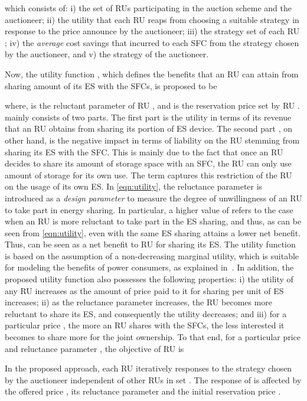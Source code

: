 \documentclass[journal,10pt]{IEEEtran}
\begin{document}
which consists of: i) the set of RUs  participating in the auction scheme and the auctioneer; ii) the utility  that each RU  reaps from choosing a suitable strategy  in response to the price  announce by the auctioneer; iii) the strategy set  of each RU ; iv) the \emph{average} cost savings  that incurred to each SFC  from the strategy chosen by the auctioneer, and v) the strategy  of the auctioneer.

Now, the utility function , which defines the benefits that an RU  can attain from sharing  amount of its ES with the SFCs, is proposed to be

where,  is the reluctant parameter of RU , and  is the reservation price set by RU .  mainly consists of two parts. The first part  is the utility in terms of its revenue that an RU  obtains from sharing its  portion of ES device. The second part , on other hand, is the negative impact in terms of liability on the RU  stemming from sharing its ES with the SFC. This is mainly due to the fact that once an RU decides to share its  amount of storage space with an SFC, the RU can only use  amount of storage for its own use. The term  captures this restriction of the RU on the usage of its own ES. In \eqref{eqn:utility}, the reluctance parameter  is introduced as a \emph{design parameter} to measure the degree of unwillingness of an RU to take part in energy sharing. In particular, a higher value of  refers to the case when an RU  is more reluctant to take part in the ES sharing, and thus, as can be seen from \eqref{eqn:utility}, even with the same ES sharing attains a lower net benefit. Thus,  can be seen as a net benefit to RU  for sharing its ES. The utility function is based on the assumption of a non-decreasing marginal utility, which is suitable for modeling the benefits of power consumers, as explained in~\cite{Samadi-C-Smartgridcomm:2010}. In addition, the proposed utility function also possesses the following properties: i)  the utility of any RU increases as the amount of price  paid to it for sharing per unit of ES increases; ii) as the reluctance parameter  increases, the  RU  becomes more reluctant to share its ES, and consequently the utility decreases; and iii) for a particular price , the more an RU shares with the SFCs, the less interested it becomes to share more for the joint ownership. To that end, for a particular price  and reluctance parameter , the objective of RU  is

In the proposed approach, each RU  iteratively responses to the strategy  chosen by the auctioneer independent of other RUs in set . The response of  is affected by the offered price , its reluctance parameter  and the initial reservation price .
\end{document}
